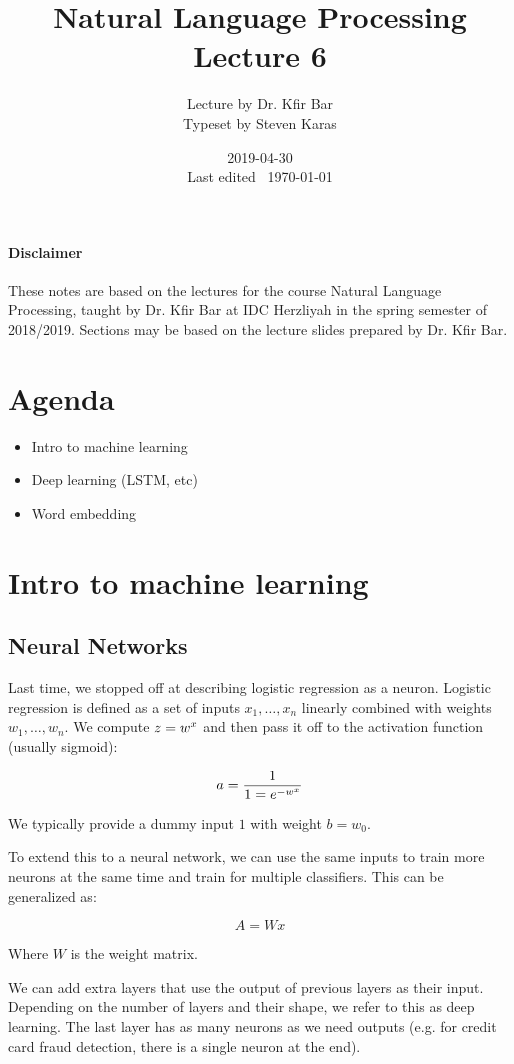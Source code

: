 \documentclass{idc_msc}
\title{Natural Language Processing \\\large Lecture 6}
\date{2019-04-30 \\ Last edited \currenttime\ \today}
\author{Lecture by Dr. Kfir Bar\\Typeset by Steven Karas}
\let\T\relax
\newcommand{\T}{{\mathpalette\raiseT\intercal}} %
\begin{document}
\paragraph{Disclaimer}

These notes are based on the lectures for the course Natural Language Processing, taught by Dr. Kfir Bar at IDC Herzliyah in the spring semester of 2018/2019.
Sections may be based on the lecture slides prepared by Dr. Kfir Bar.

\nocite{Jurafsky:2009:SLP:0131873210}
\nocite{manning1999foundations}
\nocite{DBLP:journals/corr/Goldberg15c}

\section{Agenda}

\begin{itemize}
  \item Intro to machine learning
  \item Deep learning (LSTM, etc)
  \item Word embedding
\end{itemize}

\section{Intro to machine learning}

\subsection{Neural Networks}

Last time, we stopped off at describing logistic regression as a neuron.
Logistic regression is defined as a set of inputs \(x_1, \ldots, x_n\) linearly combined with weights \(w_1, \ldots, w_n\).
We compute \(z = w^\T x\) and then pass it off to the activation function (usually sigmoid):

\[
  a = \frac{1}{1 = e^{-w^\T x}}
\]

We typically provide a dummy input \(1\) with weight \(b=w_0\).

To extend this to a neural network, we can use the same inputs to train more neurons at the same time and train for multiple classifiers.
This can be generalized as:

\[
  A = Wx
\]

Where \(W\) is the weight matrix.

We can add extra layers that use the output of previous layers as their input.
Depending on the number of layers and their shape, we refer to this as deep learning.
The last layer has as many neurons as we need outputs (e.g. for credit card fraud detection, there is a single neuron at the end).
\end{document}
